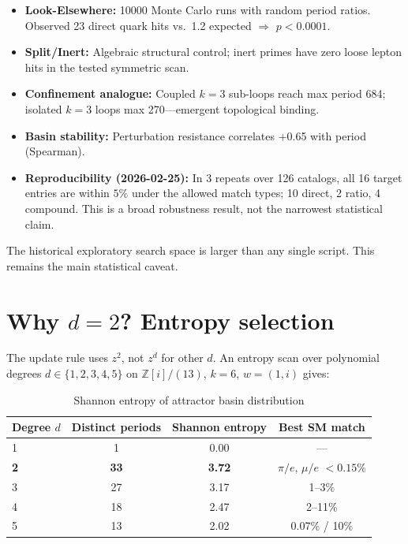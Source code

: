 \documentclass[11pt,a4paper]{article}
\begin{document}
\begin{itemize}
\item \textbf{Look-Elsewhere:} 10000 Monte Carlo runs with random period ratios. Observed 23 direct quark hits vs.\ 1.2 expected $\Rightarrow$ $p < 0.0001$.
\item \textbf{Split/Inert:} Algebraic structural control; inert primes have zero loose lepton hits in the tested symmetric scan.
\item \textbf{Confinement analogue:} Coupled $k{=}3$ sub-loops reach max period 684; isolated $k{=}3$ loops max 270---emergent topological binding.
\item \textbf{Basin stability:} Perturbation resistance correlates +0.65 with period (Spearman).
\item \textbf{Reproducibility (2026-02-25):} In 3 repeats over 126 catalogs, all 16 target entries are within $5\%$ under the allowed match types; 10 direct, 2 ratio, 4 compound. This is a broad robustness result, not the narrowest statistical claim.
\end{itemize}

The historical exploratory search space is larger than any single script. This remains the main statistical caveat.

\section{Why $d=2$? Entropy selection}

The update rule uses $z^2$, not $z^d$ for other $d$. An entropy scan over polynomial degrees $d \in \{1,2,3,4,5\}$ on $\mathbb{Z}[i]/(13)$, $k{=}6$, $w{=}(1,i)$ gives:

\begin{table}[htbp]
\centering
\caption{Shannon entropy of attractor basin distribution}
\begin{tabular}{lccc}
\toprule
Degree $d$ & Distinct periods & Shannon entropy & Best SM match \\
\midrule
1 & 1 & 0.00 & --- \\
\textbf{2} & \textbf{33} & \textbf{3.72} & $\pi/e$, $\mu/e$ $< 0.15\%$ \\
3 & 27 & 3.17 & 1--3\% \\
4 & 18 & 2.47 & 2--11\% \\
5 & 13 & 2.02 & 0.07\% / 10\% \\
\bottomrule
\end{tabular}
\end{table}
\end{document}
